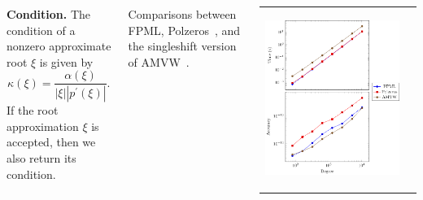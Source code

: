 \documentclass[20 pt, a0paper, portrait]{tikzposter}
\begin{document}
\begin{columns}
{	\textbf{Condition.} The condition of a nonzero approximate root $\xi$ is given by
	\begin{equation}
	\kappa(\xi)=\frac{\alpha(\xi)}{|\xi||p^{'}(\xi)|}.
	\end{equation}
	If the root approximation $\xi$ is accepted, then we also return its condition.
	}
	{
	Comparisons between FPML, Polzeros~\cite{Bini1996}, and the singleshift version of AMVW~\cite{Aurentz2015}.
	\vspace*{-2em}
	\begin{center}
	\begin{tabular}{ p{12cm} p{12cm}}
		\begin{tikzfigure}
		\includegraphics[scale=0.44]{../tests/figures/rand_poly.png}
		\end{tikzfigure}
		&
		\begin{tikzfigure}

\end{tikzfigure}
\end{tabular}
\end{center}}
\end{columns}
\end{document}
